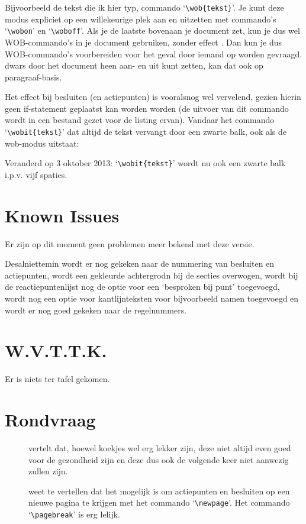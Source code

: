 \documentclass[a4paper]{notulen}
\begin{document}
		Bijvoorbeeld de tekst die ik hier typ,  commando `\lstinline!\wob{tekst}!'. Je kunt deze modus expliciet op een willekeurige plek aan en uitzetten met  commando's `\lstinline!\wobon!' en `\lstinline!\woboff!'. Als je de laatste bovenaan je document zet, kun je dus wel WOB-commando's in je document gebruiken, zonder  effect . Dan kun je dus  WOB-commando's  voorbereiden voor het geval  door iemand op worden gevraagd.  dwars door het document heen aan- en uit kunt zetten, kan dat ook op paragraaf-basis.
		
		Het effect bij besluiten (en actiepunten) is vooralsnog wel vervelend, gezien hierin geen if-statement geplaatst kan worden worden (de uitvoer van dit commando wordt in een bestand gezet voor de listing ervan). Vandaar het commando `\lstinline!\wobit{tekst}!' dat altijd de tekst vervangt door een zwarte balk, ook als de wob-modus uitstaat:
		

		Veranderd op 3 oktober 2013: `\lstinline!\wobit{tekst}!' wordt nu ook een zwarte balk i.p.v. vijf spaties.
		
	\section{Known Issues}
		Er zijn op dit moment geen problemen meer bekend met deze versie.
		
		Desalniettemin wordt er nog gekeken naar de nummering van besluiten en actiepunten, wordt een gekleurde achtergrodn bij de secties overwogen, wordt bij de reactiepuntenlijst nog de optie voor een `besproken bij punt' toegevoegd, wordt nog een optie voor kantlijnteksten voor bijvoorbeeld namen toegevoegd en wordt er nog goed gekeken naar de regelnummers.
		
	\section{W.V.T.T.K.}
		Er is niets ter tafel gekomen.
		
	\section{Rondvraag}
		\begin{description}
			\item[\ab] vertelt dat, hoewel koekjes wel erg lekker zijn, deze niet altijd even goed voor de gezondheid zijn en deze dus ook de volgende keer niet aanwezig zullen zijn.
			\item[\rb] weet te vertellen dat het mogelijk is om actiepunten en besluiten op een nieuwe pagina te krijgen met het commando `\lstinline!\newpage!'. Het commando `\lstinline!\pagebreak!' is erg lelijk.
		\end{description}
	
\end{document}
